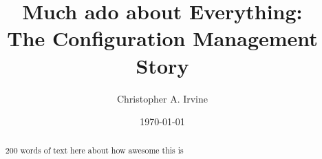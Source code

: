 \documentclass[cmpstyle]{ueacmpstyle}
\begin{document}
	\title{Much ado about Everything: \\ The Configuration Management Story}
	\author{Christopher A. Irvine}
	\date{\today}
	\maketitle
	
	\begin{abstract}
		200 words of text here about how awesome this is
	\end{abstract}
\end{document}
